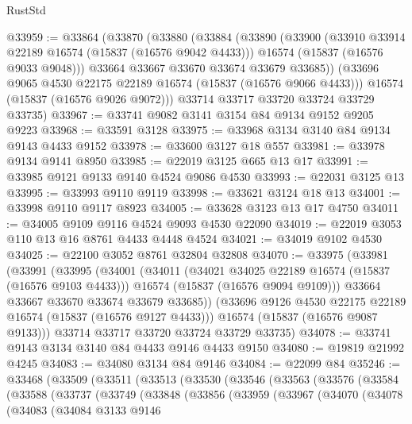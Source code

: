 \begin{lexlean}{RustStd}
\begin{coremodule}
@33959 := @33864
    (@33870
      (@33880
        (@33884
          (@33890
            (@33900
              (@33910 @33914 @22189 @16574 (@15837 (@16576 @9042 @4433)))
              @16574
              (@15837 (@16576 @9033 @9048)))
            @33664
            @33667
            @33670
            @33674
            @33679
            @33685))
        (@33696 @9065 @4530 @22175 @22189 @16574 (@15837 (@16576 @9066 @4433)))
        @16574
        (@15837 (@16576 @9026 @9072)))
      @33714
      @33717
      @33720
      @33724
      @33729
      @33735)
@33967 := @33741 @9082 @3141 @3154 @84 @9134 @9152 @9205 @9223
@33968 := @33591 @3128
@33975 := @33968 @3134 @3140 @84 @9134 @9143 @4433 @9152
@33978 := @33600 @3127 @18 @557
@33981 := @33978 @9134 @9141 @8950
@33985 := @22019 @3125 @665 @13 @17
@33991 := @33985 @9121 @9133 @9140 @4524 @9086 @4530
@33993 := @22031 @3125 @13
@33995 := @33993 @9110 @9119
@33998 := @33621 @3124 @18 @13
@34001 := @33998 @9110 @9117 @8923
@34005 := @33628 @3123 @13 @17 @4750
@34011 := @34005 @9109 @9116 @4524 @9093 @4530 @22090
@34019 := @22019 @3053 @110 @13 @16 @8761 @4433 @4448 @4524
@34021 := @34019 @9102 @4530
@34025 := @22100 @3052 @8761 @32804 @32808
@34070 := @33975
    (@33981
      (@33991
        (@33995
          (@34001
            (@34011
              (@34021 @34025 @22189 @16574 (@15837 (@16576 @9103 @4433)))
              @16574
              (@15837 (@16576 @9094 @9109)))
            @33664
            @33667
            @33670
            @33674
            @33679
            @33685))
        (@33696 @9126 @4530 @22175 @22189 @16574 (@15837 (@16576 @9127 @4433)))
        @16574
        (@15837 (@16576 @9087 @9133)))
      @33714
      @33717
      @33720
      @33724
      @33729
      @33735)
@34078 := @33741 @9143 @3134 @3140 @84 @4433 @9146 @4433 @9150
@34080 := @19819 @21992 @4245
@34083 := @34080 @3134 @84 @9146
@34084 := @22099 @84
@35246 := @33468
    (@33509
      (@33511
        (@33513
          (@33530
            (@33546
              (@33563
                (@33576
                  (@33584
                    (@33588
                      (@33737
                        (@33749
                          (@33848
                            (@33856
                              (@33959
                                (@33967
                                  (@34070
                                    (@34078
                                      (@34083
                                        (@34084
                                          @3133
                                          @9146

\end{coremodule}
\end{lexlean}

